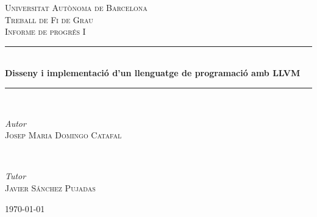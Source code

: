 ﻿\documentclass{article}
\begin{document}
\begin{titlepage}
	\newcommand{\HRule}{\rule{\linewidth}{0.4mm}} %
	
	\center

    \vspace*{25px}
	
	\textsc{\LARGE Universitat Autònoma de Barcelona}\\[1.5cm]

	\textsc{\Large Treball de Fi de Grau}\\[0.5cm]
	
	\textsc{\Large Informe de progrés I}\\[0.5cm]
	
	\HRule\\[0.4cm]
	
	{\LARGE\bfseries Disseny i implementació d'un llenguatge de programació amb LLVM}\\[0.4cm]
	
	\HRule\\[1.5cm]
	
	
	\begin{minipage}{0.5\textwidth}
		\begin{flushleft}
			\large
			\textit{Autor}\\
			\textsc{Josep Maria Domingo Catafal}
		\end{flushleft}
	\end{minipage}
	~
	\begin{minipage}{0.4\textwidth}
		\begin{flushright}
			\large
			\textit{Tutor}\\
			\textsc{Javier Sánchez Pujadas}
		\end{flushright}
	\end{minipage}
	

	\vfill\vfill\vfill %
	
	{\large\today} %

	\vfill %
\end{titlepage}

\tableofcontents
\newpage

\end{document}
